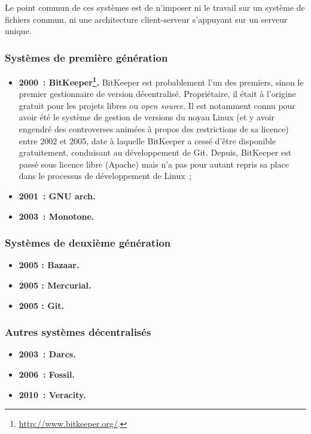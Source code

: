 Le point commun de ces systèmes est de n'imposer ni le travail sur un
système de fichiers commun, ni une architecture client-serveur
s'appuyant sur un serveur unique.

\subsubsection{Systèmes de première génération} %

\begin{itemize}
\item \textbf{2000~:
    BitKeeper\footnote{\url{http://www.bitkeeper.org/}.}.}
  BitKeeper est probablement l'un des premiers, sinon le premier
  gestionnaire de version décentralisé. Propriétaire, il était à
  l'origine gratuit pour les projets libres ou \textit{open
    source}. Il est notamment connu pour avoir été le système de
  gestion de versions du noyau Linux (et y avoir engendré des
  controverses animées à propos des restrictions de sa licence) entre
  2002 et 2005, date à laquelle BitKeeper a cessé d'être disponible
  gratuitement, conduisant au développement de Git. Depuis, BitKeeper
  est passé sous licence libre (Apache) mais n'a pas pour autant
  repris sa place dans le processus de développement de Linux~;
\item \textbf{2001~: GNU arch.} %
\item \textbf{2003~: Monotone.} %
\end{itemize}

\subsubsection{Systèmes de deuxième génération}

\begin{itemize}
\item \textbf{2005 : Bazaar.} %
\item \textbf{2005 : Mercurial.} %
\item \textbf{2005 : Git.} %
\end{itemize}

\subsubsection{Autres systèmes décentralisés}

\begin{itemize}
\item \textbf{2003~: Darcs.} %
\item \textbf{2006~: Fossil.} %
\item \textbf{2010~: Veracity.} %
\end{itemize}

